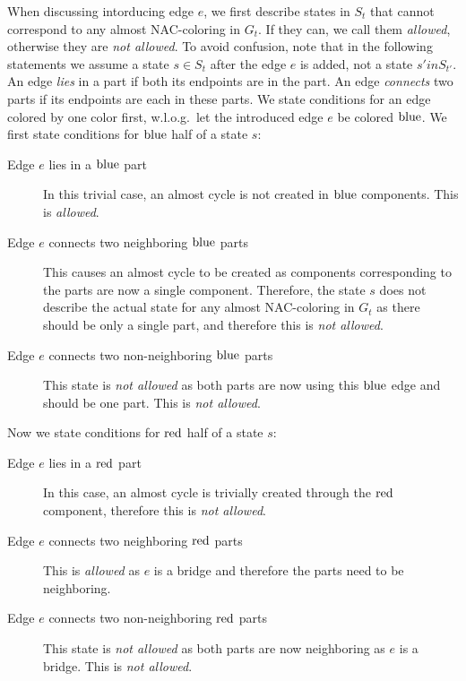 When discussing \IntroduceEdgeNode{} intorducing edge \( e \),
we first describe states in \( S_{t} \)
that cannot correspond to any almost NAC-coloring in \( G_t \).
If they can, we call them \emph{allowed}, otherwise they are \emph{not allowed}.
To avoid confusion, note that in the following statements we assume
a state \( s \in S_t \) after the edge \( e \) is added, not a state \( s' in S_{t'} \).
%
An edge \emph{lies} in a part if both its endpoints are in the part.
An edge \emph{connects} two parts if its endpoints are each in these parts.
%
We state conditions for an edge colored by one color first,
w.l.o.g.\ let the introduced edge \( e \) be colored \( \text{blue} \).
We first state conditions for \( \text{blue} \) half of a state \( s \):
%
\begin{description}
	\item[Edge \( e \) lies in a \( \text{blue} \) part]
	      In this trivial case, an almost cycle is not created in \( \text{blue} \) components.
	      This is \emph{allowed}.
	\item[Edge \( e \) connects two neighboring \( \text{blue} \) parts]
	      This causes an almost cycle to be created as
	      components corresponding to the parts
	      are now a single component.
	      Therefore, the state \( s \) does not describe
	      the actual state for any almost NAC-coloring in \( G_t \)
	      as there should be only a single part, and therefore this is \emph{not allowed}.
	\item[Edge \( e \) connects two non-neighboring \( \text{blue} \) parts]
	      This state is \emph{not allowed} as both parts
	      are now using this \( \text{blue} \) edge and should be one part.
	      This is \emph{not allowed}.
\end{description}
%
Now we state conditions for \( \text{red} \) half of a state \( s \):
%
\begin{description}
	\item[Edge \( e \) lies in a \( \text{red} \) part]
	      In this case, an almost cycle is trivially created
	      through the \( \text{red} \) component,
	      therefore this is \emph{not allowed}.
	\item[Edge \( e \) connects two neighboring \( \text{red} \) parts]
	      This is \emph{allowed} as \( e \) is a bridge and
	      therefore the parts need to be neighboring.
	\item[Edge \( e \) connects two non-neighboring \( \text{red} \) parts]
	      This state is \emph{not allowed} as both parts
	      are now neighboring as \( e \) is a bridge.
	      This is \emph{not allowed}.
\end{description}
%
%

